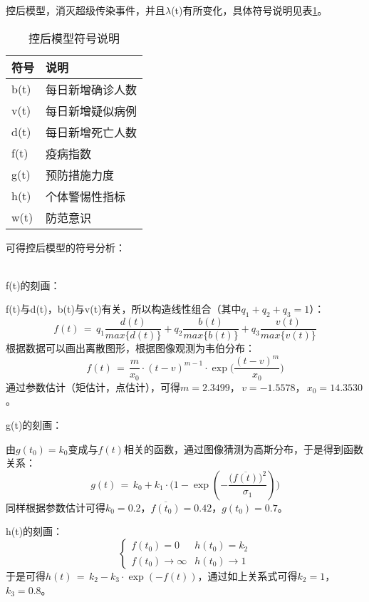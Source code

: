 控后模型，消灭超级传染事件，并且$\lambda$(t)有所变化，具体符号说明见表\ref{tab:symintro2}。

\begin{table}[htbp]
\centering
\begin{tabular}{@{}ll@{}}
\toprule
符号 & 说明 \\ \midrule
b(t) & 每日新增确诊人数 \\
v(t) & 每日新增疑似病例 \\
d(t) & 每日新增死亡人数 \\
f(t) & 疫病指数 \\
g(t) & 预防措施力度 \\
h(t) & 个体警惕性指标 \\
w(t) & 防范意识 \\ \bottomrule
\end{tabular}
\caption{控后模型符号说明}\label{tab:symintro2}
\end{table}

可得控后模型的符号分析：\\
\phantom{what is dead may never die}
\\[1cm]\par

f(t)的刻画：\par
f(t)与d(t)，b(t)与v(t)有关，所以构造线性组合（其中$q_1+q_2+q_3=1$）：
$$f(t)\,=\,q_1\frac{d(t)}{max\lbrace{}d(t)\rbrace}+q_2\frac{b(t)}{max\lbrace{}b(t)\rbrace}+q_3\frac{v(t)}{max\lbrace{}v(t)\rbrace}$$
根据数据可以画出离散图形，根据图像观测为韦伯分布：
$$f(t)\,=\,\frac{m}{x_0}\cdot{}(t-v)^{m-1}\cdot{}\exp\Bigg(\dfrac{(t-v)^m}{x_0}\Bigg)$$
通过参数估计（矩估计，点估计），可得$m=2.3499$，$\,v=-1.5578$，$\,x_0=14.3530$。\\[1cm]\par

g(t)的刻画：\par
由$g(t_0)=k_0$变成与$f(t)$相关的函数，通过图像猜测为高斯分布，于是得到函数关系：
$$g(t)\,=\,k_0+k_1\cdot{}\Bigg(1-\exp(-\frac{\Big(\overline{f(t)}\Big)^2}{\sigma_1})\Bigg)$$
同样根据参数估计可得$k_0=0.2$，$\overline{f(t_0)}=0.42$，$g(t_0)=0.7$。\\[1cm]\par

h(t)的刻画：
\begin{equation*}
\begin{cases}
f(t_0)=0 & h(t_0)=k_2 \\
f(t_0)\rightarrow \infty & h(t_0)\rightarrow 1
\end{cases}
\end{equation*}
于是可得$h(t)\,=\,k_2-k_3\cdot{}\exp(-f(t))$，通过如上关系式可得$k_2=1$，$k_3=0.8$。\\[1cm]\par

